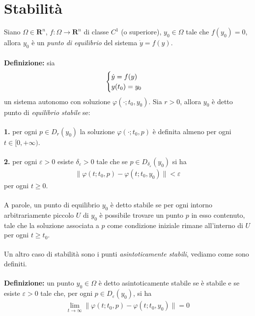 \documentclass{article}
\begin{document}
\section{Stabilità}
Siano $\Omega \in \mathbf{R}^n$, $f : \Omega \longrightarrow \mathbf{R}^n$ di classe $C^1$ (o superiore), $y_0 \in \Omega$ tale che $f(y_0) = 0$, allora $y_0$ è un \textit{punto di equilibrio} del sistema $\dot{y} = f(y)$. \\ \\
\textbf{Definizione:} sia 
\begin{equation}
    \begin{cases}
        \dot{y} = f(y) \\
        y(t_0) = y_0
    \end{cases} \notag
\end{equation}
un sistema autonomo con soluzione $\varphi( \cdot; t_0, y_0)$. Sia $r > 0$, allora $y_0$ è detto punto di \textit{equilibrio stabile} se: \\ \\
\textbf{1.} per ogni $p \in D_r(y_0)$ la soluzione $\varphi(\cdot; t_0, p)$ è definita almeno per ogni $t \in [0, +\infty)$. \\ \\
\textbf{2.} per ogni $\varepsilon > 0$ esiste $\delta_\varepsilon > 0$ tale che se $p \in D_{\delta_\varepsilon}(y_0)$ si ha
\begin{align}
    \|\varphi(t; t_0, p) - \varphi(t; t_0, y_0)\| < \varepsilon \tag{2.2}
\end{align}
per ogni $t \geq 0$. \\ \\
A parole, un punto di equilibrio $y_0$ è detto stabile se per ogni intorno arbitrariamente piccolo $U$ di $y_0$ è possibile trovare un punto $p$ in esso contenuto, tale che la soluzione associata a $p$ come condizione iniziale rimane all'interno di $U$ per ogni $t \geq t_0$. \\ \\ 
Un altro caso di stabilità sono i punti \textit{asintoticamente stabili}, vediamo come sono definiti. \\ \\
\textbf{Definizione:} un punto $y_0 \in \Omega$ è detto asintoticamente stabile se è stabile e se esiste $\varepsilon > 0$ tale che, per ogni $p \in D_\varepsilon(y_0)$, si ha
\begin{align}
    \lim_{t \rightarrow \infty} \|\varphi(t; t_0, p) - \varphi(t; t_0, y_0)\| = 0 \tag{2.3}
\end{align}
\end{document}
